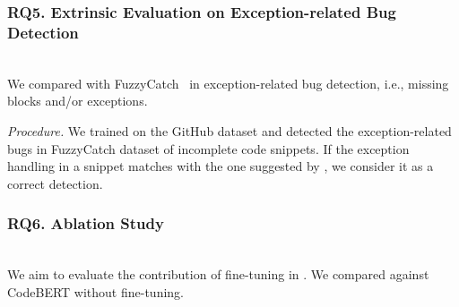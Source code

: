 




%
\subsubsection{RQ5. Extrinsic Evaluation on Exception-related Bug Detection}~\\
 We compared with
FuzzyCatch~\cite{xrank-fse20} in exception-related
bug detection, i.e., missing  blocks and/or exceptions.



{\em Procedure.} We trained {\tool} on the GitHub dataset and detected
the exception-related bugs in FuzzyCatch dataset of incomplete
code snippets. If the exception handling in a snippet matches with
the one suggested by {\tool}, we consider it as a correct detection.



\subsubsection{RQ6. Ablation Study}~\\
We aim to evaluate the contribution of fine-tuning in {\tool}. We
compared {\tool} against CodeBERT without fine-tuning.

